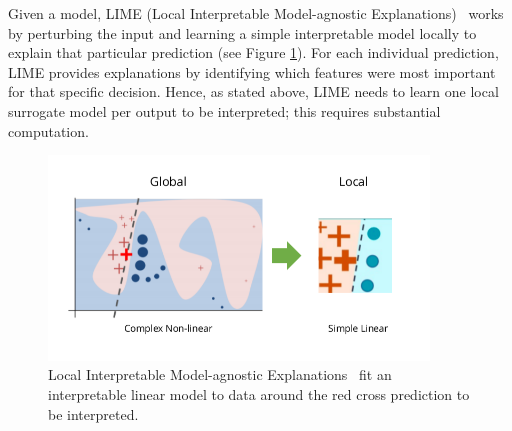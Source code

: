 Given a model, LIME (Local Interpretable Model-agnostic Explanations)~\cite{lime} works by perturbing the input and learning a simple interpretable model locally to explain that particular prediction (see Figure \ref{fig:lime}). For each individual prediction, LIME provides explanations by identifying which features were most important for that specific decision.
Hence, as stated above, LIME needs to learn one local surrogate model per output to be interpreted; this requires substantial computation.

\begin{figure}
    \includegraphics[width=0.9\textwidth]{images/lime.png}
    \caption{Local Interpretable Model-agnostic Explanations~\cite{lime} fit an interpretable linear model to data around the red cross prediction to be interpreted.}\label{fig:lime}
\end{figure}



